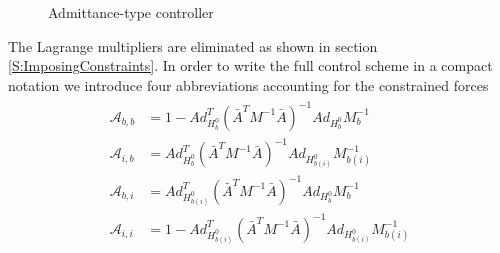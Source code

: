 \documentclass[a4paper,twoside, openright,12pt]{report}
\begin{document}
\begin{figure}[b!]
	\centering
	\small
	\def\svgwidth{0.8\columnwidth}
	
	\caption{Admittance-type controller}
	\label{FIG:admittancecontrol}
\end{figure}
The Lagrange multipliers are eliminated as shown in section \ref{S:ImposingConstraints}. In order to write the full control scheme in a compact notation we introduce four abbreviations accounting for the constrained forces
\begin{eqnarray}
\begin{aligned}
\mathcal{A}_{b,b} &= 
1 - Ad_{H_b^0}^T(\bar{A}^TM^{-1}\bar{A})^{-1} Ad_{H_b^0}M_b^{-1} \\
\mathcal{A}_{i,b} &= Ad_{H_b^0}^T(\bar{A}^TM^{-1}\bar{A})^{-1} Ad_{H_{b(i)}^0}M_{b(i)}^{-1} \\
\mathcal{A}_{b,i} &= Ad_{H_{b(i)}^0}^T(\bar{A}^TM^{-1}\bar{A})^{-1} Ad_{H_b^0}M_b^{-1} \\
\mathcal{A}_{i,i} &= 
1 - Ad_{H_{b(i)}^0}^T(\bar{A}^TM^{-1}\bar{A})^{-1} Ad_{H_{b(i)}^0}M_{b(i)}^{-1}
\end{aligned}
\end{eqnarray}
\end{document}
